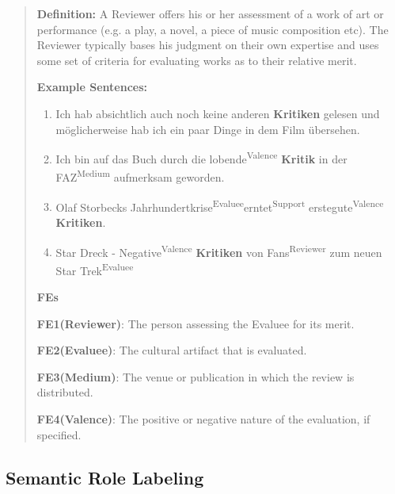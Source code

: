\documentclass[12pt]{article}
\begin{document}
\begin{quote}
\textbf{Definition:}
A Reviewer offers his or her assessment of a work of art or performance (e.g. a play, a novel, a piece of music composition etc). The Reviewer typically bases his judgment on their own expertise and uses some set of criteria for evaluating works as to their relative merit.

\textbf{Example Sentences:}
\begin{enumerate}
\item Ich hab absichtlich auch noch keine anderen \textbf{Kritiken} gelesen und möglicherweise hab ich ein paar Dinge in dem Film übersehen.
\item Ich bin auf das Buch durch die \lbrack lobende\rbrack \textsuperscript{Valence} \textbf{Kritik} \lbrack in der FAZ\rbrack \textsuperscript{Medium} aufmerksam geworden.
\item \lbrack Olaf Storbecks Jahrhundertkrise\rbrack\textsuperscript{Evaluee}\lbrack erntet\rbrack\textsuperscript{Support} erste\lbrack gute\rbrack \textsuperscript{Valence} \textbf{Kritiken}.
\item Star Dreck - \lbrack Negative\rbrack \textsuperscript{Valence} \textbf{Kritiken} \lbrack von Fans\rbrack \textsuperscript{Reviewer}  \lbrack zum neuen Star Trek\rbrack \textsuperscript{Evaluee}
\end{enumerate}


\textbf{FEs}


\textbf{FE1(Reviewer)}: The person assessing the Evaluee for its merit.

\textbf{FE2(Evaluee)}: The cultural artifact that is evaluated.

\textbf{FE3(Medium)}: The venue or publication in which the review is distributed.

\textbf{FE4(Valence)}: The positive or negative nature of the evaluation, if specified. 
\end{quote}

\subsection{Semantic Role Labeling}\label{subsec:introduction_SRL}
\end{document}
